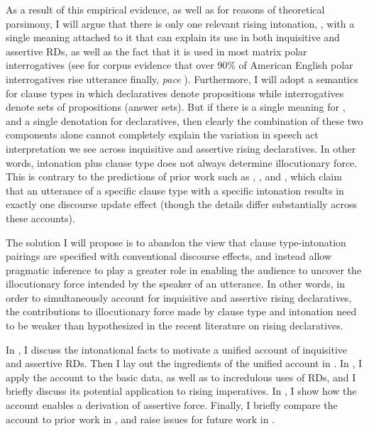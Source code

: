 \documentclass[output=paper,colorlinks,citecolor=brown]{langscibook}
\begin{document}
	As a result of this empirical evidence, as well as for reasons of theoretical parsimony, I will argue that there is only one relevant rising intonation, \rise, with a single meaning attached to it that can explain its use in both inquisitive and assertive RDs, as well as the fact that it is used in most matrix polar interrogatives (see \citealt{hedberg17} for corpus evidence that over 90\% of American English polar interrogatives rise utterance finally, \emph{pace} \citealt{geluykens88}). Furthermore, I will adopt a semantics for clause types in which declaratives denote propositions while interrogatives denote sets of propositions (answer sets). But if there is a single meaning for \rise, and a single denotation for declaratives, then clearly the combination of these two components alone cannot completely explain the variation in speech act interpretation we see across inquisitive and assertive rising declaratives. In other words, intonation plus clause type does not always determine illocutionary force. This is contrary to the predictions of prior work such as \citet{farkas17}, \citet{jeong18}, and \citet{rudin18}, which claim that an utterance of a specific clause type with a specific intonation results in exactly one discourse update effect (though the details differ substantially across these accounts).
	
	The solution I will propose is to abandon the view that clause type-intonation pairings are specified with conventional discourse effects, and instead allow pragmatic inference to play a greater role in enabling the audience to uncover the illocutionary force intended by the speaker of an utterance. In other words, in order to simultaneously account for inquisitive and assertive rising declaratives, the contributions to illocutionary force made by clause type and intonation need to be weaker than hypothesized in the recent literature on rising declaratives. 
	
	
	
	In , I discuss the intonational facts to motivate a unified account of inquisitive and assertive RDs. Then I lay out the ingredients of the unified account in . In , I apply the account to the basic data, as well as to  incredulous uses of RDs, and I briefly discuss its potential application to rising imperatives. In , I show how the account enables a derivation of assertive force. Finally, I briefly compare the account to prior work in , and raise issues for future work  in .
	
\end{document}
